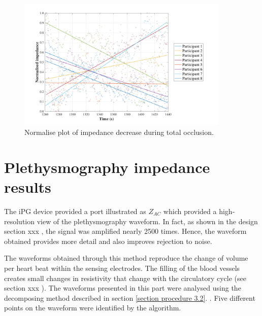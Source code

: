 \begin{figure}[!htbp]
	\centering
	\includegraphics[width=0.9\textwidth,height=0.9\textheight,keepaspectratio]{figure5}    
	\caption{Normalise plot of impedance decrease during total occlusion.}
	\label{fig:normalise:total_occlusion}
\end{figure}


\section{Plethysmography impedance results}
\label{section results 3}
The iPG device provided a port illustrated as $Z_{AC}$  which provided a high-resolution view of the plethysmography waveform.  In fact, as shown in the design section xxx , the signal was amplified nearly 2500 times. Hence, the waveform obtained provides more detail and also improves rejection  to noise.

The waveforms obtained through this method reproduce the change of volume per heart beat within the sensing electrodes. The filling of the blood vessels creates small changes in resistivity that change with the circulatory cycle (see section xxx ). The waveforms presented in this part were analysed using the decomposing method described in section \ref{section procedure 3.2}. . Five different points on the waveform were identified by the algorithm.

